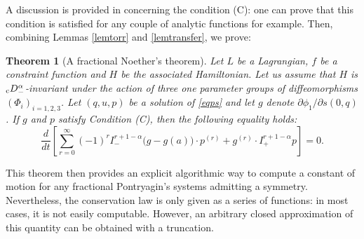 \documentclass[english,11pt,reqno]{smfart}
\newtheorem{theorem}{Theorem}
\def\di{\displaystyle}
\newcommand{\cDM}{{}_{{\rm c}} D^\alpha_-}
\begin{document}
A discussion is provided in \cite{bour2} concerning the condition (C): one can prove that this condition is satisfied for any couple of analytic functions for example. Then, combining Lemmas \ref{lemtorr} and \ref{lemtransfer}, we prove:

\begin{theorem}[A fractional Noether's theorem]\label{thmnoetherfrac}
Let $L$ be a Lagrangian, $f$ be a constraint function and $H$ be the associated Hamiltonian. Let us assume that $H$ is $\cDM$-invariant under the action of three one parameter groups of diffeomorphisms $(\Phi_i)_{i=1,2,3}$. Let $(q,u,p)$ be a solution of \eqref{eqps} and let $g$ denote $\partial \phi_1 / \partial s( 0,q )$. If $g$ and $p$ satisfy Condition {\rm (C)}, then the following equality holds:
\begin{equation}\label{eqthmnoetherfrac}
\dfrac{d}{dt} \left[ \di \sum_{r=0}^{\infty} (-1)^r I^{r+1-\alpha}_- \big(g-g(a)\big) \cdot p^{(r)} + g^{(r)} \cdot I^{r+1-\alpha}_+ p \right] = 0 .
\end{equation}
\end{theorem}

This theorem then provides an explicit algorithmic way to compute a constant of motion for any fractional Pontryagin's systems admitting a symmetry. Nevertheless, the conservation law is only given as a series of functions: in most cases, it is not easily computable. However, an arbitrary closed approximation of this quantity can be obtained with a truncation. \\
\end{document}
